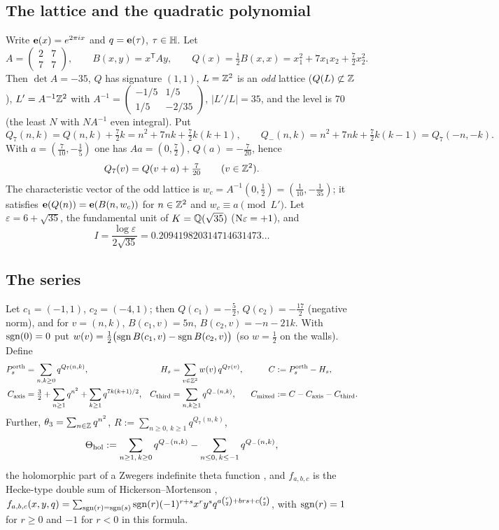\subsection{The lattice and the quadratic polynomial}
Write $\mathbf{e}(x)=e^{2\pi i x}$ and $q=\mathbf{e}(\tau)$, $\tau\in\mathbb{H}$. Let
\[
A=\begin{pmatrix}2&7\\7&7\end{pmatrix},\qquad B(x,y)=x^{\mathsf T}Ay,\qquad
Q(x)=\tfrac12B(x,x)=x_1^2+7x_1x_2+\tfrac72x_2^2 .
\]
Then $\det A=-35$, $Q$ has signature $(1,1)$, $L=\mathbb{Z}^2$ is an \emph{odd} lattice ($Q(L)\not\subset\mathbb{Z}$),
$L'=A^{-1}\mathbb{Z}^2$ with $A^{-1}=\begin{pmatrix}-1/5&1/5\\1/5&-2/35\end{pmatrix}$, $|L'/L|=35$, and the level is
$70$ (the least $N$ with $NA^{-1}$ even integral). Put
\[
Q_7(n,k)=Q(n,k)+\tfrac72k=n^2+7nk+\tfrac72k(k+1),\qquad
Q_-(n,k)=n^2+7nk+\tfrac72k(k-1)=Q_7(-n,-k).
\]
With $a=(\tfrac7{10},-\tfrac15)$ one has $Aa=(0,\tfrac72)$, $Q(a)=-\tfrac7{20}$, hence
\begin{equation}\label{eq:shift}
Q_7(v)=Q(v+a)+\tfrac{7}{20}\qquad(v\in\mathbb{Z}^2).
\end{equation}
The characteristic vector of the odd lattice is $w_c=A^{-1}(0,\tfrac12)=(\tfrac1{10},-\tfrac1{35})$; it satisfies
$\mathbf{e}(Q(n))=\mathbf{e}(B(n,w_c))$ for $n\in\mathbb{Z}^2$ and $w_c\equiv a\pmod{L'}$.
Let $\varepsilon=6+\sqrt{35}$, the fundamental unit of $K=\mathbb{Q}(\sqrt{35})$ ($\mathrm{N}\varepsilon=+1$), and
\[
I=\frac{\log\varepsilon}{2\sqrt{35}}=0.209419820314714631473\ldots
\]

\subsection{The series}
Let $c_1=(-1,1)$, $c_2=(-4,1)$; then $Q(c_1)=-\tfrac52$, $Q(c_2)=-\tfrac{17}2$ (negative norm), and for
$v=(n,k)$, $B(c_1,v)=5n$, $B(c_2,v)=-n-21k$. With $\operatorname{sgn}(0)=0$ put
$w(v)=\tfrac12\bigl(\operatorname{sgn} B(c_1,v)-\operatorname{sgn} B(c_2,v)\bigr)$ (so $w=\tfrac12$ on the walls). Define
\begin{align*}
P^{\mathrm{orth}}_s&=\sum_{n,k\ge0}q^{Q_7(n,k)}, &
H_s&=\sum_{v\in\mathbb{Z}^2}w(v)\,q^{Q_7(v)}, &
C&:=P^{\mathrm{orth}}_s-H_s,\\
C_{\mathrm{axis}}&=\tfrac32+\sum_{n\ge1}q^{n^2}+\sum_{k\ge1}q^{7k(k+1)/2}, &
C_{\mathrm{third}}&=\sum_{n,k\ge1}q^{Q_-(n,k)}, &
C_{\mathrm{mixed}}&:=C-C_{\mathrm{axis}}-C_{\mathrm{third}}.
\end{align*}
Further, $\theta_3=\sum_{n\in\mathbb{Z}}q^{n^2}$, $R:=\sum_{n\ge0,\,k\ge1}q^{Q_7(n,k)}$,
\[
\Theta_{\mathrm{hol}}:=\sum_{n\ge1,\,k\ge0}q^{Q_-(n,k)}-\sum_{n\le0,\,k\le-1}q^{Q_-(n,k)},
\]
the holomorphic part of a Zwegers indefinite theta function \cite{Zw}, and $f_{a,b,c}$ is the
Hecke-type double sum of Hickerson--Mortenson \cite[Def.~0.2]{HM},
$f_{a,b,c}(x,y,q)=\sum_{\operatorname{sgn}(r)=\operatorname{sgn}(s)}\operatorname{sgn}(r)(-1)^{r+s}x^ry^sq^{a\binom r2+brs+c\binom s2}$, with
$\operatorname{sgn}(r)=1$ for $r\ge0$ and $-1$ for $r<0$ in this formula.

